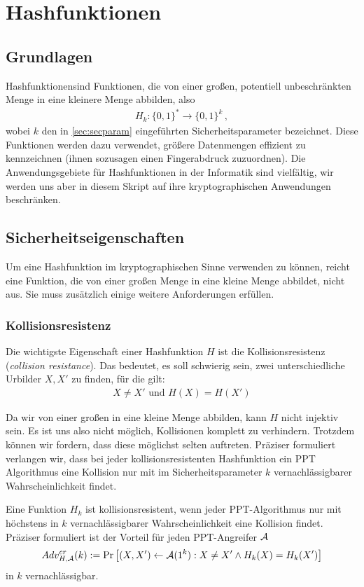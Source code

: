 \chapter{Hashfunktionen}\label{cha:hash}
\section{Grundlagen}
Hashfunktionen\indexHashFunction sind Funktionen, die von einer großen,
potentiell unbeschränkten Menge in eine kleinere Menge abbilden, also 
\begin{align*}
H_k\colon \{0,1\}^* \rightarrow \{0,1\}^k\, ,
\end{align*}
wobei $k$ den in \ref{sec:secparam} eingeführten Sicherheitsparameter
bezeichnet.  Diese Funktionen werden dazu verwendet, größere Datenmengen
effizient zu kennzeichnen (ihnen sozusagen einen Fingerabdruck
zuzuordnen). Die Anwendungsgebiete für Hashfunktionen in der Informatik
sind vielfältig, wir werden uns aber in diesem Skript auf ihre
kryptographischen Anwendungen beschränken\indexCryptHashFunction.

\section{Sicherheitseigenschaften}
Um eine Hashfunktion im kryptographischen Sinne\indexCryptHashFunction
verwenden zu können, reicht eine Funktion, die von einer großen Menge in
eine kleine Menge abbildet, nicht aus. 
Sie muss zusätzlich einige weitere Anforderungen erfüllen.

\subsection{Kollisionsresistenz}
Die wichtigste Eigenschaft einer Hashfunktion $H$ ist die
Kollisionsresistenz (\emph{collision
  resistance})\indexCollisionResistance. Das bedeutet, es soll schwierig
sein, zwei unterschiedliche Urbilder $X, X'$ zu finden, für die gilt: 
\begin{align*}
X \neq X' \text{ und } H(X) = H(X')
\end{align*}

Da wir von einer großen in eine kleine Menge abbilden, kann $H$ nicht
injektiv sein. Es ist uns also nicht möglich, Kollisionen komplett zu
verhindern. Trotzdem können wir fordern, dass diese möglichst selten
auftreten. Präziser formuliert verlangen wir, dass bei jeder
kollisionsresistenten Hashfunktion ein PPT Algorithmus eine Kollision
nur mit im Sicherheitsparameter $k$ vernachlässigbarer
Wahrscheinlichkeit findet.
\begin{definition}[Kollisionsresistenz]
Eine Funktion $H_k$ ist kollisionsresistent\indexCollisionResistance,
wenn jeder PPT-Algorithmus nur mit höchstens in $k$ vernachlässigbarer
Wahrscheinlichkeit eine Kollision findet.  Präziser formuliert ist der
Vorteil für jeden PPT-Angreifer $\mathcal{A}$
\begin{align*}
Adv^{cr}_{H,\mathcal{A}}(k):= \Pr \left[ (X, X') \leftarrow \mathcal{A}(1^k) : X \neq X'
  \land H_k(X) = H_k(X')\right] 
\end{align*}
in $k$ vernachlässigbar.
\end{definition}

